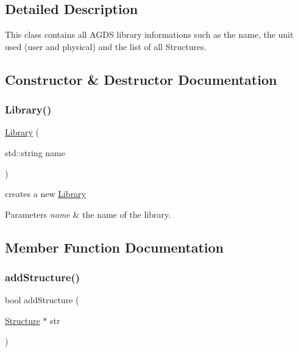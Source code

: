 \subsection{Detailed Description}
This class contains all A\+G\+DS library informations such as the name, the unit used (user and physical) and the list of all Structures. 

\subsection{Constructor \& Destructor Documentation}
\mbox{\label{class_a_g_d_s_1_1_library_a9244ebe2cc60781aaf25cf559ea2473a}} 
\subsubsection{\texorpdfstring{Library()}{Library()}}
{\footnotesize\ttfamily \mbox{\hyperlink{class_a_g_d_s_1_1_library}{Library}} (\begin{DoxyParamCaption}\item[{std\+::string}]{name }\end{DoxyParamCaption})}



creates a new \mbox{\hyperlink{class_a_g_d_s_1_1_library}{Library}} 


\begin{DoxyParams}{Parameters}
{\em name} & the name of the library. \\
\hline
\end{DoxyParams}


\subsection{Member Function Documentation}
\mbox{\label{class_a_g_d_s_1_1_library_a93d333a20154e0b688ff3ff213039171}} 
\subsubsection{\texorpdfstring{add\+Structure()}{addStructure()}}
{\footnotesize\ttfamily bool add\+Structure (\begin{DoxyParamCaption}\item[{\mbox{\hyperlink{class_a_g_d_s_1_1_structure}{Structure}} $\ast$}]{str }\end{DoxyParamCaption})}



